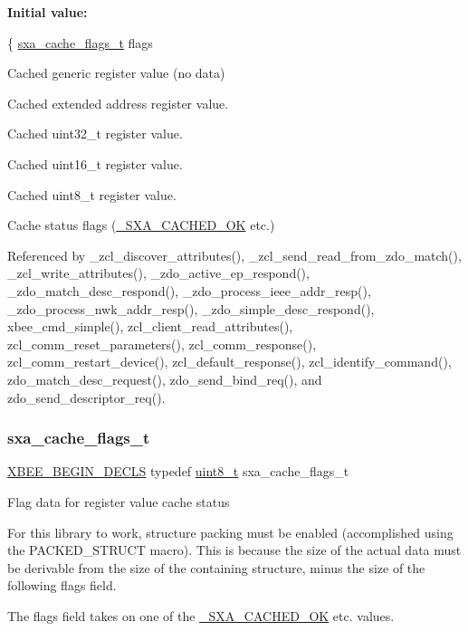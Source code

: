 {\bfseries Initial value\+:}
\begin{DoxyCode}
\{
   \hyperlink{group___s_x_a_ga21b45e50d83fcc1363c4239313e88c06}{sxa\_cache\_flags\_t}  flags
\end{DoxyCode}


Cached generic register value (no data) 

Cached extended address register value.

Cached uint32\+\_\+t register value.

Cached uint16\+\_\+t register value.

Cached uint8\+\_\+t register value.

Cache status flags (\hyperlink{group___s_x_a_gga0411cd49bb5b71852cecd93bcbf0ca2da54498f64b3ad7c2be423d32b45deac04}{\+\_\+\+S\+X\+A\+\_\+\+C\+A\+C\+H\+E\+D\+\_\+\+OK} etc.) 

Referenced by \+\_\+zcl\+\_\+discover\+\_\+attributes(), \+\_\+zcl\+\_\+send\+\_\+read\+\_\+from\+\_\+zdo\+\_\+match(), \+\_\+zcl\+\_\+write\+\_\+attributes(), \+\_\+zdo\+\_\+active\+\_\+ep\+\_\+respond(), \+\_\+zdo\+\_\+match\+\_\+desc\+\_\+respond(), \+\_\+zdo\+\_\+process\+\_\+ieee\+\_\+addr\+\_\+resp(), \+\_\+zdo\+\_\+process\+\_\+nwk\+\_\+addr\+\_\+resp(), \+\_\+zdo\+\_\+simple\+\_\+desc\+\_\+respond(), xbee\+\_\+cmd\+\_\+simple(), zcl\+\_\+client\+\_\+read\+\_\+attributes(), zcl\+\_\+comm\+\_\+reset\+\_\+parameters(), zcl\+\_\+comm\+\_\+response(), zcl\+\_\+comm\+\_\+restart\+\_\+device(), zcl\+\_\+default\+\_\+response(), zcl\+\_\+identify\+\_\+command(), zdo\+\_\+match\+\_\+desc\+\_\+request(), zdo\+\_\+send\+\_\+bind\+\_\+req(), and zdo\+\_\+send\+\_\+descriptor\+\_\+req().

\mbox{\label{group___s_x_a_ga21b45e50d83fcc1363c4239313e88c06}} 
\subsubsection{\texorpdfstring{sxa\+\_\+cache\+\_\+flags\+\_\+t}{sxa\_cache\_flags\_t}}
{\footnotesize\ttfamily \hyperlink{group__hal_ga336bff4f4a6012aacc4468132bbd3d7f}{X\+B\+E\+E\+\_\+\+B\+E\+G\+I\+N\+\_\+\+D\+E\+C\+LS} typedef \hyperlink{group__hal__dos_gae1affc9ca37cfb624959c866a73f83c2}{uint8\+\_\+t} sxa\+\_\+cache\+\_\+flags\+\_\+t}

Flag data for register value cache status

For this library to work, structure packing must be enabled (accomplished using the P\+A\+C\+K\+E\+D\+\_\+\+S\+T\+R\+U\+CT macro). This is because the size of the actual data must be derivable from the size of the containing structure, minus the size of the following flags field.

The flags field takes on one of the \hyperlink{group___s_x_a_gga0411cd49bb5b71852cecd93bcbf0ca2da54498f64b3ad7c2be423d32b45deac04}{\+\_\+\+S\+X\+A\+\_\+\+C\+A\+C\+H\+E\+D\+\_\+\+OK} etc. values. 